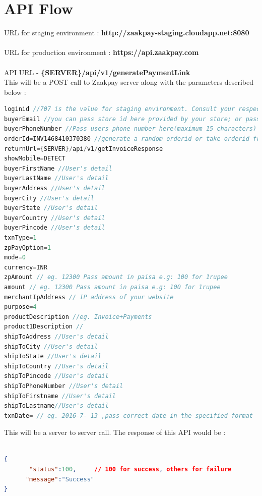 \documentclass{article}
\begin{document}
\section{API Flow}
URL for staging environment : 
{\bfseries http://zaakpay-staging.cloudapp.net:8080  } \\ \\
URL for production environment :
{\bfseries https://api.zaakpay.com } \\ \\
API URL - {\bfseries \{SERVER\}/api/v1/generatePaymentLink }
\\

 This will be a POST call to Zaakpay server along with the parameters described below :
 
\begin{lstlisting}[language=java,breaklines=true]
loginid //707 is the value for staging environment. Consult your respective account manager for production value
buyerEmail //you can pass store id here provided by your store; or pass users email id if available
buyerPhoneNumber //Pass users phone number here(maximum 15 characters)
orderId=INV1468410370380 //generate a random orderid or take orderid from merchant
returnUrl={SERVER}/api/v1/getInvoiceResponse
showMobile=DETECT
buyerFirstName //User's detail
buyerLastName //User's detail
buyerAddress //User's detail
buyerCity //User's detail
buyerState //User's detail
buyerCountry //User's detail
buyerPincode //User's detail
txnType=1
zpPayOption=1
mode=0
currency=INR
zpAmount // eg. 12300 Pass amount in paisa e.g: 100 for 1rupee
amount // eg. 12300 Pass amount in paisa e.g: 100 for 1rupee
merchantIpAddress // IP address of your website
purpose=4
productDescription //eg. Invoice+Payments
product1Description //
shipToAddress //User's detail
shipToCity //User's detail
shipToState //User's detail
shipToCountry //User's detail
shipToPincode //User's detail
shipToPhoneNumber //User's detail
shipToFirstname //User's detail
shipToLastname//User's detail
txnDate= // eg. 2016-7- 13 ,pass correct date in the specified format
\end{lstlisting}
\newpage
This will be a server to server call. The response of this API would be :
\begin{lstlisting}[language=json,breaklines=true]

{
       "status":100,     // 100 for success, others for failure
      "message":"Success"
}
\end{lstlisting}
\end{document}
